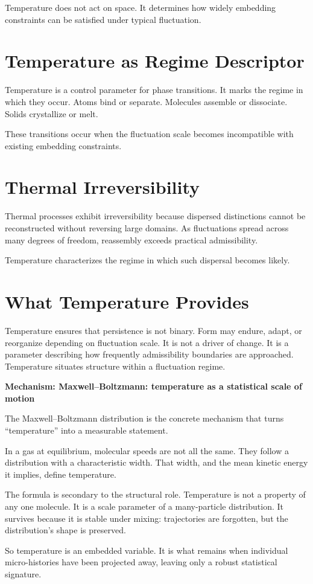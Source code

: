 \documentclass[11pt,twoside,openright]{book}
\newenvironment{mechanismbox}[1]
  {\begin{framed}\noindent\textbf{Mechanism: #1}\par\medskip}
  {\end{framed}}
\begin{document}
Temperature does not act on space.
It determines how widely embedding constraints
can be satisfied under typical fluctuation.
\section*{Temperature as Regime Descriptor}

Temperature is a control parameter for phase transitions. It marks the regime in which they occur. Atoms bind or separate. Molecules assemble or dissociate. Solids crystallize or melt.

These transitions occur when
the fluctuation scale becomes incompatible
with existing embedding constraints.
\section*{Thermal Irreversibility}

Thermal processes exhibit irreversibility because dispersed distinctions cannot be reconstructed without reversing large domains. As fluctuations spread across many degrees of freedom, reassembly exceeds practical admissibility.

Temperature characterizes
the regime in which such dispersal becomes likely.
\section*{What Temperature Provides}

Temperature ensures that persistence is not binary. Form may endure, adapt, or reorganize depending on fluctuation scale. It is not a driver of change. It is a parameter describing how frequently admissibility boundaries are approached. Temperature situates structure within a fluctuation regime.

\begin{mechanismbox}{Maxwell--Boltzmann: temperature as a statistical scale of motion}
The Maxwell--Boltzmann distribution is the concrete mechanism that turns ``temperature'' into a measurable statement.

In a gas at equilibrium, molecular speeds are not all the same. They follow a distribution with a characteristic width. That width, and the mean kinetic energy it implies, define temperature.

The formula is secondary to the structural role. Temperature is not a property of any one molecule. It is a scale parameter of a many-particle distribution. It survives because it is stable under mixing: trajectories are forgotten, but the distribution's shape is preserved.

So temperature is an embedded variable.
It is what remains when individual micro-histories have been projected away, leaving only a robust statistical signature.
\end{mechanismbox}
\end{document}
